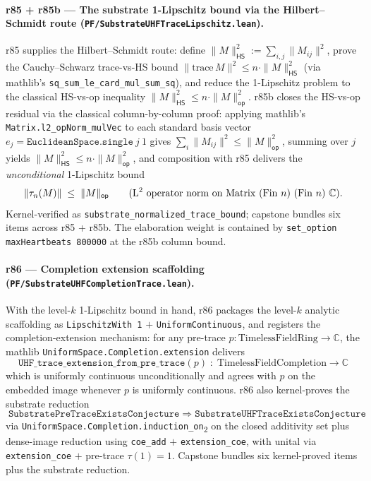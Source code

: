 \documentclass[11pt,a4paper]{amsart}
\theoremstyle{plain}
\theoremstyle{definition}
\begin{document}
\paragraph{r85 + r85b --- The substrate 1-Lipschitz bound via the Hilbert--Schmidt route (\texttt{PF/SubstrateUHFTraceLipschitz.lean}).} r85 supplies the Hilbert--Schmidt route: define $\|M\|_{\textsf{HS}}^2 := \sum_{i,j} \|M_{ij}\|^2$, prove the Cauchy--Schwarz trace-vs-HS bound $\|\mathrm{trace}\,M\|^2 \le n \cdot \|M\|_{\textsf{HS}}^2$ (via mathlib's \texttt{sq\_sum\_le\_card\_mul\_sum\_sq}), and reduce the 1-Lipschitz problem to the classical HS-vs-op inequality $\|M\|_{\textsf{HS}}^2 \le n \cdot \|M\|_{\textsf{op}}^2$. r85b closes the HS-vs-op residual via the classical column-by-column proof: applying mathlib's \texttt{Matrix.l2\_opNorm\_mulVec} to each standard basis vector $e_j = \texttt{EuclideanSpace.single}~j~1$ gives $\sum_i \|M_{ij}\|^2 \le \|M\|_{\textsf{op}}^2$, summing over $j$ yields $\|M\|_{\textsf{HS}}^2 \le n \cdot \|M\|_{\textsf{op}}^2$, and composition with r85 delivers the \emph{unconditional} 1-Lipschitz bound
\[
\| \tau_n(M) \| \;\le\; \| M \|_{\textsf{op}} \qquad \text{(L\textsuperscript{2} operator norm on } \mathrm{Matrix}~(\mathrm{Fin}~n)~(\mathrm{Fin}~n)~\mathbb{C}\text{)}.
\]
Kernel-verified as \texttt{substrate\_normalized\_trace\_bound}; capstone  bundles six items across r85 + r85b. The elaboration weight is contained by \texttt{set\_option maxHeartbeats 800000} at the r85b column bound.

\paragraph{r86 --- Completion extension scaffolding (\texttt{PF/SubstrateUHFCompletionTrace.lean}).} With the level-$k$ 1-Lipschitz bound in hand, r86 packages the level-$k$ analytic scaffolding as \texttt{LipschitzWith 1} $+$ \texttt{UniformContinuous}, and registers the completion-extension mechanism: for any pre-trace $p \colon \mathrm{TimelessFieldRing} \to \mathbb{C}$, the mathlib \texttt{UniformSpace.Completion.extension} delivers
\[
\texttt{UHF\_trace\_extension\_from\_pre\_trace}(p) \; : \; \mathrm{TimelessFieldCompletion} \to \mathbb{C}
\]
which is uniformly continuous unconditionally and agrees with $p$ on the embedded image whenever $p$ is uniformly continuous. r86 also kernel-proves the substrate reduction
\[
\texttt{SubstratePreTraceExistsConjecture} \; \Longrightarrow \; \texttt{SubstrateUHFTraceExistsConjecture}
\]
via \texttt{UniformSpace.Completion.induction\_on}\textsubscript{2} on the closed additivity set plus dense-image reduction using \texttt{coe\_add} $+$ \texttt{extension\_coe}, with unital via \texttt{extension\_coe} $+$ pre-trace $\tau(1) = 1$. Capstone  bundles six kernel-proved items plus the substrate reduction.
\end{document}
